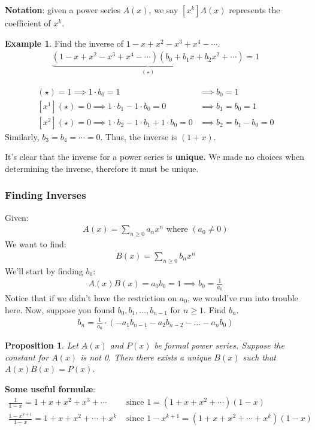 \documentclass[]{article}
\newtheorem*{proposition}{Proposition}
\theoremstyle{definition}
\newtheorem{ex}{Example}[section]
\newcommand{\lecture}[1]{\marginpar{{\footnotesize $\leftarrow$ \underline{#1}}}}
\begin{document}
			\textbf{Notation}: given a power series $A(x)$, we say $[x^k]A(x)$ represents the coefficient of $x^k$.

			\begin{ex}
				Find the inverse of $1 - x + x^2 - x^3 + x^4 - \cdots$.
				\begin{align*}
					\underbrace{(1 - x + x^2 - x^3 + x^4 - \cdots)(b_0 + b_1x + b_2x^2 + \cdots)}_{(\star)} = 1
				\end{align*}

				\begin{align*}
					[x^0](\star) = 1 \implies 1 \cdot b_0 = 1 &\implies b_0 = 1 \\
					[x^1](\star) = 0 \implies 1 \cdot b_1 - 1 \cdot b_0 = 0 &\implies b_1 = b_0 = 1 \\
					[x^2](\star) = 0 \implies 1 \cdot b_2 - 1 \cdot b_1 + 1 \cdot b_0 = 0 &\implies b_2 = b_1 - b_0 = 0
				\end{align*}
				Similarly, $b_3 = b_4 = \cdots = 0$. Thus, the inverse is $(1 + x)$.
			\end{ex}

			It's clear that the inverse for a power series is \textbf{unique}. We made no choices when determining the inverse, therefore it must be unique.
			\subsubsection{Finding Inverses} \lecture{January 16, 2013}
				Given:
				\begin{align*}
					A(x) = \sum_{n \ge 0} a_nx^n \text{ where } (a_0 \ne 0)
				\end{align*}
				We want to find:
				\begin{align*}
					B(x) = \sum_{n \ge 0} b_nx^n
				\end{align*}
				We'll start by finding $b_0$:
				\begin{align*}
					[x^0]A(x)B(x) = a_0b_0 = 1 \implies b_0 = \frac{1}{a_0}
				\end{align*}
				Notice that if we didn't have the restriction on $a_0$, we would've run into trouble here. Now, suppose you found $b_0, b_1, \ldots, b_{n - 1}$ for $n \ge 1$. Find $b_n$.
				\begin{align*}
					b_n = \frac{1}{a_0} \cdot (-a_1b_{n - 1} - a_2b_{n - 2} - \ldots - a_nb_0)
				\end{align*}

				\begin{proposition}
					Let $A(x)$ and $P(x)$ be formal power series.
					Suppose the constant for $A(x)$ is not 0. Then there exists a unique $B(x)$ such that $A(x)B(x) = P(x)$.
				\end{proposition}
				\textbf{Some useful formul\ae}:
					\begin{align*}
						\frac{1}{1 - x} = 1 + x + x^2 + x^3 + \cdots &\text{ since } 1 = (1 + x + x^2 + \cdots)(1 - x) \\
						\frac{1 - x^{k+1}}{1-x} = 1 + x + x^2 + \cdots + x^k &\text{ since } 1 - x^{k+1} = (1 + x + x^2 + \cdots + x^k)(1-x)
					\end{align*}
\end{document}
